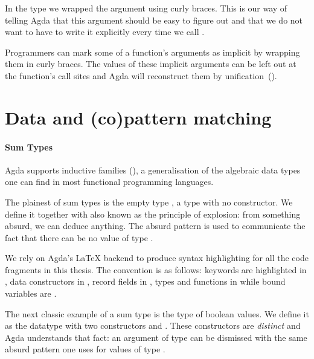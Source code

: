 In the type  we wrapped the  argument using curly braces.
This is our way of telling Agda that this argument should be easy to figure
out and that we do not want to have to write it explicitly every time we
call .

\begin{feature}
Programmers can mark some of a function's arguments as implicit by
wrapping them in curly braces. The values of these implicit arguments
can be left out at the function's call sites and Agda will reconstruct
them by unification~(\cite{DBLP:conf/tlca/AbelP11}).
\end{feature}

\section{Data and (co)pattern matching}

\paragraph{Sum Types} Agda supports inductive families
(\cite{dybjer1991inductive}), a generalisation of the algebraic data types
one can find in most functional programming languages.

The plainest of sum types is the empty type , a type with no constructor.
We define it together with  also known as the principle of explosion:
from something absurd, we can deduce anything. The absurd pattern \AS{()} is
used to communicate the fact that there can be no value of type .

\begin{minipage}{0.5\textwidth}
\end{minipage}\begin{minipage}{0.5\textwidth}
\end{minipage}

\begin{feature} We rely on Agda's \LaTeX{} backend to produce
syntax highlighting for all the code fragments in this thesis. The convention
is as follows: keywords are highlighted in , data constructors in
, record fields in , types and functions in 
while bound variables are .
\end{feature}

The next classic example of a sum type is the type of boolean values. We define
it as the datatype with two constructors  and . These
constructors are \emph{distinct} and Agda understands that fact: an argument
of type {  } can be dismissed with the same absurd
pattern one uses for values of type .

